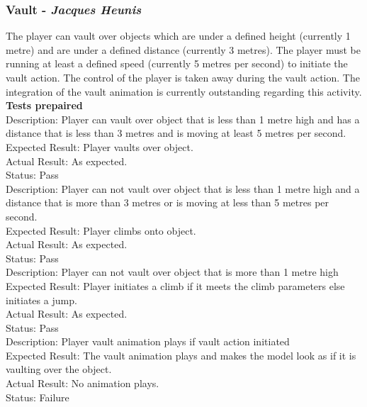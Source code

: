 \documentclass[a4paper,10pt]{article}
\begin{document}
\subsubsection{Vault - \textit{Jacques Heunis}}
The player can vault over objects which are under a defined height (currently 1 metre) and are under a defined distance (currently 3 metres). The player must be running at least a defined speed (currently 5 metres per second) to initiate the vault action. The control of the player is taken away during the vault action. The integration of the vault animation is currently outstanding regarding this activity.
\smallskip\\\textbf{Tests prepaired}\\
Description: Player can vault over object that is less than 1 metre high and has a distance that is less than 3 metres and is moving at least 5 metres per second. \\
Expected Result: Player vaults over object.\\
Actual Result:  As expected.\\
Status: Pass
\smallskip\\
Description: Player can not vault over object that is less than 1 metre high and a distance that is more than 3 metres or is moving at less than 5 metres per second. \\
Expected Result: Player climbs onto object.\\
Actual Result:  As expected.\\
Status: Pass
\smallskip\\
Description: Player can not vault over object that is more than 1 metre high\\
Expected Result: Player initiates a climb if it meets the climb parameters else initiates a jump.\\
Actual Result:  As expected.\\
Status: Pass
\smallskip\\
Description: Player vault animation plays if vault action initiated\\
Expected Result: The vault animation plays and makes the model look as if it is vaulting over the object.\\
Actual Result:  No animation plays.\\
Status: Failure
\end{document}
